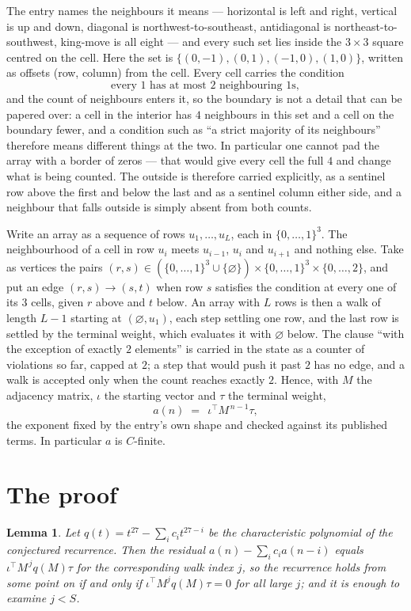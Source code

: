 \documentclass[11pt,a4paper]{article}
\theoremstyle{plain}
\newtheorem{lemma}[theorem]{Lemma}
\theoremstyle{definition}
\begin{document}
The entry names the neighbours it means --- horizontal is left and right, vertical is up and
down, diagonal is northwest-to-southeast, antidiagonal is northeast-to-southwest, king-move is
all eight --- and every such set lies inside the $3\times3$ square centred on the cell. Here
the set is $\{(0,-1), (0,1), (-1,0), (1,0)\}$, written as offsets (row, column) from the cell. Every cell carries
the condition
\[
\text{every 1 has at most 2 neighbouring 1s},
\]
and the count of neighbours enters it, so the boundary is not a detail that can be papered
over: a cell in the interior has $4$ neighbours in this set and a cell on the boundary
fewer, and a condition such as ``a strict majority of its neighbours'' therefore means
different things at the two. In particular one cannot pad the array with a border of zeros ---
that would give every cell the full $4$ and change what is being counted. The outside is
therefore carried
explicitly, as a sentinel row above the first and below the last and as a sentinel column
either side, and a neighbour that falls outside is simply absent from both counts.

Write an array as a sequence of rows $u_1,\dots,u_L$, each in
$\{0,\dots,1\}^{3}$. The neighbourhood of a cell in row $u_i$ meets $u_{i-1}$,
$u_i$ and $u_{i+1}$ and nothing else. Take as vertices the pairs
$(r,s)\in(\{0,\dots,1\}^{3}\cup\{\varnothing\})\times\{0,\dots,1\}^{3} \times \{0,\dots,2\}$,
and put an edge $(r,s)\to(s,t)$ when row $s$ satisfies the condition at every one of its
$3$ cells, given $r$ above and $t$ below. An array with $L$ rows is then a walk of length
$L-1$ starting at $(\varnothing,u_1)$, each step settling one row, and the last row is
settled by the terminal weight, which evaluates it with $\varnothing$ below. The clause ``with the exception of exactly $2$ elements'' is carried in
the state as a counter of violations so far, capped at $2$; a step that would push it past
$2$ has no edge, and a walk is accepted only when the count reaches exactly $2$. Hence,
with $M$ the adjacency matrix, $\iota$ the starting vector and $\tau$ the terminal weight,
\[
a(n)\;=\;\,\iota^{\!\top}M^{\,n-1}\tau ,
\]
the exponent fixed by the entry's own shape and checked against its published terms. In
particular $a$ is $C$-finite.

\section{The proof}

\begin{lemma}\label{lem:crit}
Let $q(t)=t^{27}-\sum_i c_it^{27-i}$ be the characteristic polynomial of the
conjectured recurrence. Then the residual $a(n)-\sum_ic_ia(n-i)$ equals
$\iota^{\!\top}M^{\,j}q(M)\tau$ for the corresponding walk index $j$, so the
recurrence holds from some point on if and only if $\iota^{\!\top}M^{j}q(M)\tau=0$ for all
large $j$; and it is enough to examine $j<S$.
\end{lemma}
\end{document}
